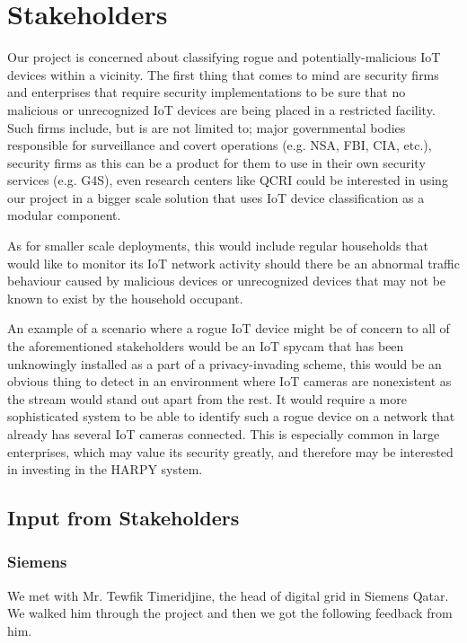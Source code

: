 \documentclass{article}
\begin{document}
\section{Stakeholders}
Our project is concerned about classifying rogue  and potentially-malicious IoT devices within a vicinity. The first thing that comes to mind are security firms and enterprises that require security implementations to be sure that no malicious or unrecognized IoT devices are being placed in a restricted facility. Such firms include, but is are not limited to; major governmental bodies responsible for surveillance and covert operations (e.g. NSA, FBI, CIA, etc.), security firms as this can be a product for them to use in their own security services (e.g. G4S), even research centers like QCRI could be interested in using our project in a bigger scale solution that uses IoT device classification as a modular component.\newline

As for smaller scale deployments, this would include regular households that would like to monitor its IoT network activity should there be an abnormal traffic behaviour caused by malicious devices or unrecognized devices that may not be known to exist by the household occupant. \newline

An example of a scenario where a rogue IoT device might be of concern to all of the aforementioned stakeholders would be an IoT spycam that has been unknowingly installed as a part of a privacy-invading scheme, this would be an obvious thing to detect in an environment where IoT cameras are nonexistent as the stream would stand out apart from the rest. It would require a more sophisticated system to be able to identify such a rogue device on a network that already has several IoT cameras connected. This is especially common in large enterprises, which may value its security greatly, and therefore may be interested in investing in the HARPY system.

\subsection{Input from Stakeholders}
\subsubsection{Siemens}
We met with Mr. Tewfik Timeridjine, the head of digital grid in Siemens Qatar. We walked him through the project and then we got the following feedback from him. \newline
\end{document}
